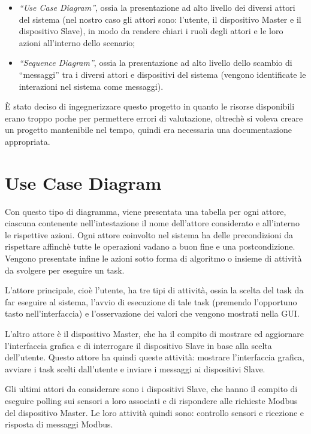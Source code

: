 \documentclass[a4paper,titlepage]{book}
\newcommand{\itema}{\begin{itemize}[noitemsep,topsep=10pt,parsep=23pt,partopsep=0pt]}
\begin{document}
\itema 

\item\textit{``Use Case Diagram''}, ossia la presentazione ad alto livello dei diversi attori del sistema (nel nostro caso gli attori sono: l'utente, il dispositivo Master e il dispositivo Slave), in modo da rendere chiari i ruoli degli attori e le loro azioni all'interno dello scenario;
\item\textit{``Sequence Diagram''}, ossia la presentazione ad alto livello dello scambio di ``messaggi'' tra i diversi attori e dispositivi del sistema (vengono identificate le interazioni nel sistema come messaggi).

\end{itemize}

È stato deciso di ingegnerizzare questo progetto in quanto le risorse disponibili erano troppo poche per permettere errori di valutazione, oltrechè si voleva creare un progetto mantenibile nel tempo, quindi era necessaria una documentazione appropriata.

\section{Use Case Diagram}

Con questo tipo di diagramma, viene presentata una tabella per ogni attore, ciascuna contenente nell'intestazione il nome dell'attore considerato e all'interno le rispettive azioni. Ogni attore coinvolto nel sistema ha delle precondizioni da rispettare affinchè tutte le operazioni vadano a buon fine e una postcondizione. Vengono presentate infine le azioni sotto forma di algoritmo o insieme di attività da svolgere per eseguire un task.

L'attore principale, cioè l'utente, ha tre tipi di attività, ossia la scelta del task da far eseguire al sistema, l'avvio di esecuzione di tale task (premendo l'opportuno tasto nell'interfaccia) e l'osservazione dei valori che vengono mostrati nella GUI.

L'altro attore è il dispositivo Master, che ha il compito di mostrare ed aggiornare l'interfaccia grafica e di interrogare il dispositivo Slave in base alla scelta dell'utente. Questo attore ha quindi queste attività: mostrare l'interfaccia grafica, avviare i task scelti dall'utente e inviare i messaggi ai dispositivi Slave.

Gli ultimi attori da considerare sono i dispositivi Slave, che hanno il compito di eseguire polling sui sensori a loro associati e di rispondere alle richieste Modbus del dispositivo Master. Le loro attività quindi sono: controllo sensori e ricezione e risposta di messaggi Modbus.
\end{document}
